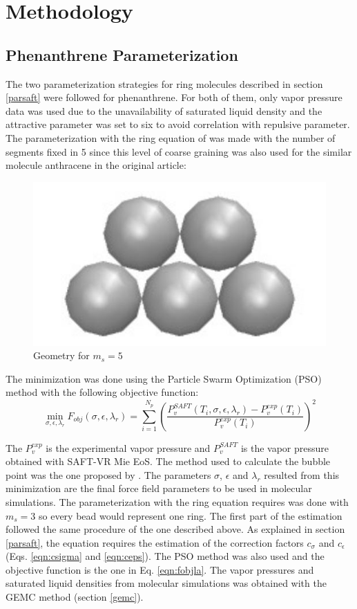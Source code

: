 \chapter{Methodology} %

\label{Chapter4} %

\section{Phenanthrene Parameterization}

The two parameterization strategies for ring molecules described in section \ref{parsaft} were followed for phenanthrene. For both of them, only vapor pressure data \cite{pvphen} was used due to the unavailability of saturated liquid density and the attractive parameter was set to six to avoid correlation with repulsive parameter. The parameterization with the ring equation of  was made with the number of segments fixed in 5 since this level of coarse graining was also used for the similar molecule anthracene in the original article:
\begin{figure}[th]
\centering
\includegraphics[width=0.35\linewidth]{Figures/fen5}
\caption{Geometry for $m_{s}=5$}
\label{fig:fen5}
\end{figure}

The minimization was done using the Particle Swarm Optimization (PSO) method with the following objective function:
\begin{equation}
\min\limits_{\sigma,\epsilon,\lambda_{r}} F_{obj}(\sigma,\epsilon,\lambda_{r})= \sum_{i=1}^{N_{p}} \left(\frac{P_{v}^{SAFT}(T_{i},\sigma,\epsilon,\lambda_{r})-P_{v}^{exp}(T_{i})}{P_{v}^{exp}(T_{i})} \right)^2
\label{eqn:fobjm}
\end{equation}

The $P_{v}^{exp}$ is the experimental vapor pressure and $P_{v}^{SAFT}$ is the vapor pressure obtained with SAFT-VR Mie EoS. The method used to calculate the bubble point was the one proposed by . The parameters $\sigma$, $\epsilon $ and $\lambda _{r}$ resulted from this minimization are the final force field parameters to be used in molecular simulations. The parameterization with the  ring equation requires was done with $m_{s}=3$ so every bead would represent one ring. The first part of the estimation followed the same procedure of the one described above. As explained in section \ref{parsaft}, the  equation requires the estimation of the correction factors $c_{\sigma}$ and $c_{\epsilon}$ (Eqs. \eqref{eqn:csigma} and \eqref{eqn:ceps}). The PSO method was also used and the objective function is the one in Eq. \eqref{eqn:fobjla}. The vapor pressures and saturated liquid densities from molecular simulations was obtained with the GEMC method (section \ref{gemc}).
    
